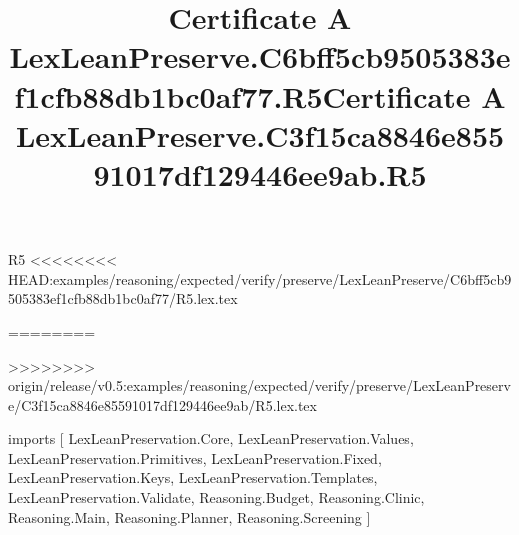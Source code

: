 \begin{lexlean}{R5}
<<<<<<<< HEAD:examples/reasoning/expected/verify/preserve/LexLeanPreserve/C6bff5cb9505383ef1cfb88db1bc0af77/R5.lex.tex
\title{Certificate A LexLeanPreserve.C6bff5cb9505383ef1cfb88db1bc0af77.R5}
========
\title{Certificate A LexLeanPreserve.C3f15ca8846e85591017df129446ee9ab.R5}
>>>>>>>> origin/release/v0.5:examples/reasoning/expected/verify/preserve/LexLeanPreserve/C3f15ca8846e85591017df129446ee9ab/R5.lex.tex
\begin{coremodule}
imports [
  LexLeanPreservation.Core,
  LexLeanPreservation.Values,
  LexLeanPreservation.Primitives,
  LexLeanPreservation.Fixed,
  LexLeanPreservation.Keys,
  LexLeanPreservation.Templates,
  LexLeanPreservation.Validate,
  Reasoning.Budget,
  Reasoning.Clinic,
  Reasoning.Main,
  Reasoning.Planner,
  Reasoning.Screening
]


\end{coremodule}
\end{lexlean}
